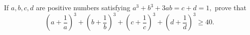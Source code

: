 If $a, b, c, d$ are positive numbers satisfying $a^3 + b^3 +3ab = c + d = 1,$ prove that \[\left(a+\frac{1}{a}\right)^3+\left(b+\frac{1}{b}\right)^3+\left(c+\frac{1}{c}\right)^3+\left(d+\frac{1}{d}\right)^3\geq 40.\]